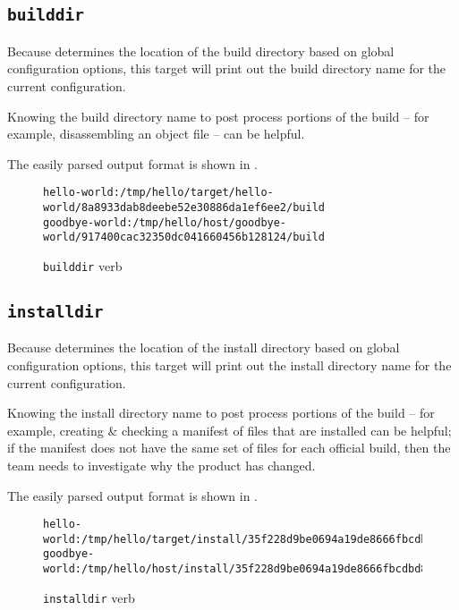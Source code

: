 \subsection{\texttt{builddir}}

Because \lmsbw determines the location of the build directory based on
global configuration options, this target will print out the build
directory name for the current configuration.

Knowing the build directory name to post process portions of the build
-- for example, disassembling an object file -- can be helpful.

The easily parsed output format is shown in
.

\begin{figure}[tbh]
\hrulefill
\begin{scriptsize}
\begin{verbatim}
hello-world:/tmp/hello/target/hello-world/8a8933dab8deebe52e30886da1ef6ee2/build
goodbye-world:/tmp/hello/host/goodbye-world/917400cac32350dc041660456b128124/build
\end{verbatim}
\end{scriptsize}
\hrulefill
\caption{\texttt{builddir} verb}\label{usinglmsbw:builddir-verb}
\end{figure}

\subsection{\texttt{installdir}}\label{usinglmsbw:installdir}

Because \lmsbw determines the location of the install directory based
on global configuration options, this target will print out the
install directory name for the current configuration.

Knowing the install directory name to post process portions of the
build -- for example, creating \& checking a manifest of files that
are installed can be helpful; if the manifest does not have the same
set of files for each official build, then the \bni team needs to
investigate why the product has changed.

The easily parsed output format is shown in
.

\begin{figure}[tbh]
\hrulefill
\begin{footnotesize}
\begin{verbatim}
hello-world:/tmp/hello/target/install/35f228d9be0694a19de8666fbcdbd80d
goodbye-world:/tmp/hello/host/install/35f228d9be0694a19de8666fbcdbd80d
\end{verbatim}
\end{footnotesize}
\hrulefill
\caption{\texttt{installdir} verb}\label{usinglmsbw:installdir-verb}
\end{figure}

